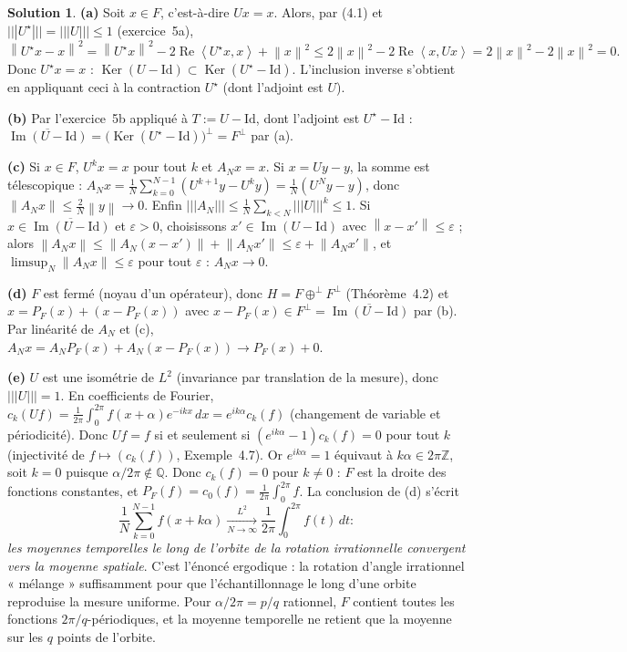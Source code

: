 \documentclass[11pt,a4paper]{article}
\newcommand{\Z}{\mathbb{Z}}
\newcommand{\Q}{\mathbb{Q}}
\newcommand{\adh}[1]{\overline{#1}}
\newcommand{\norm}[1]{\left\|#1\right\|}
\newcommand{\opnorm}[1]{|\!|\!|#1|\!|\!|}
\newcommand{\ps}[2]{\left\langle #1,#2\right\rangle}
\newcommand{\ie}{c'est-à-dire}
\DeclareMathOperator{\Ker}{Ker}
\DeclareMathOperator{\Ima}{Im}
\renewcommand{\Re}{\operatorname{Re}}
\theoremstyle{definition}
\newtheorem*{solution}{Solution}
\begin{document}
\begin{solution}
\noindent\textbf{(a)} Soit $x\in F$, \ie{} $Ux=x$. Alors, par (4.1) et $\opnorm{U^\star}=\opnorm U\le1$ (exercice~5a),
\[
\norm{U^\star x-x}^2=\norm{U^\star x}^2-2\Re\ps{U^\star x}x+\norm x^2\le2\norm x^2-2\Re\ps x{Ux}=2\norm x^2-2\norm x^2=0 .
\]
Donc $U^\star x=x$ : $\Ker(U-\mathrm{Id})\subset\Ker(U^\star-\mathrm{Id})$. L'inclusion inverse s'obtient en appliquant ceci à la contraction $U^\star$ (dont l'adjoint est $U$).

\medskip
\noindent\textbf{(b)} Par l'exercice~5b appliqué à $T:=U-\mathrm{Id}$, dont l'adjoint est $U^\star-\mathrm{Id}$ : $\adh{\Ima(U-\mathrm{Id})}=\big(\Ker(U^\star-\mathrm{Id})\big)^\perp=F^\perp$ par (a).

\medskip
\noindent\textbf{(c)} Si $x\in F$, $U^kx=x$ pour tout $k$ et $A_Nx=x$. Si $x=Uy-y$, la somme est télescopique : $A_Nx=\frac1N\sum_{k=0}^{N-1}(U^{k+1}y-U^ky)=\frac1N(U^Ny-y)$, donc $\norm{A_Nx}\le\frac2N\norm y\to0$. Enfin $\opnorm{A_N}\le\frac1N\sum_{k<N}\opnorm U^k\le1$. Si $x\in\adh{\Ima(U-\mathrm{Id})}$ et $\varepsilon>0$, choisissons $x'\in\Ima(U-\mathrm{Id})$ avec $\norm{x-x'}\le\varepsilon$ ; alors $\norm{A_Nx}\le\norm{A_N(x-x')}+\norm{A_Nx'}\le\varepsilon+\norm{A_Nx'}$, et $\limsup_N\norm{A_Nx}\le\varepsilon$ pour tout $\varepsilon$ : $A_Nx\to0$.

\medskip
\noindent\textbf{(d)} $F$ est fermé (noyau d'un opérateur), donc $H=F\oplus^\perp F^\perp$ (Théorème~4.2) et $x=P_F(x)+(x-P_F(x))$ avec $x-P_F(x)\in F^\perp=\adh{\Ima(U-\mathrm{Id})}$ par (b). Par linéarité de $A_N$ et (c), $A_Nx=A_NP_F(x)+A_N(x-P_F(x))\to P_F(x)+0$.

\medskip
\noindent\textbf{(e)} $U$ est une isométrie de $L^2$ (invariance par translation de la mesure), donc $\opnorm U=1$. En coefficients de Fourier, $c_k(Uf)=\frac1{2\pi}\int_0^{2\pi}f(x+\alpha)e^{-ikx}\,dx=e^{ik\alpha}c_k(f)$ (changement de variable et périodicité). Donc $Uf=f$ si et seulement si $(e^{ik\alpha}-1)c_k(f)=0$ pour tout $k$ (injectivité de $f\mapsto(c_k(f))$, Exemple~4.7). Or $e^{ik\alpha}=1$ équivaut à $k\alpha\in2\pi\Z$, soit $k=0$ puisque $\alpha/2\pi\notin\Q$. Donc $c_k(f)=0$ pour $k\ne0$ : $F$ est la droite des fonctions constantes, et $P_F(f)=c_0(f)=\frac1{2\pi}\int_0^{2\pi}f$. La conclusion de (d) s'écrit
\[
\frac1N\sum_{k=0}^{N-1}f(x+k\alpha)\xrightarrow[N\to\infty]{L^2}\frac1{2\pi}\int_0^{2\pi}f(t)\,dt :
\]
\emph{les moyennes temporelles le long de l'orbite de la rotation irrationnelle convergent vers la moyenne spatiale}. C'est l'énoncé ergodique : la rotation d'angle irrationnel « mélange » suffisamment pour que l'échantillonnage le long d'une orbite reproduise la mesure uniforme. Pour $\alpha/2\pi=p/q$ rationnel, $F$ contient toutes les fonctions $2\pi/q$-périodiques, et la moyenne temporelle ne retient que la moyenne sur les $q$ points de l'orbite.
\end{solution}
\end{document}
